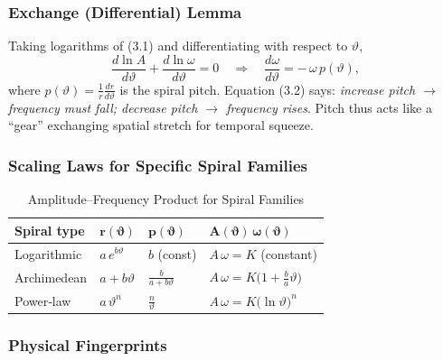 \medskip
\subsubsection{Exchange (Differential) Lemma}

Taking logarithms of (3.1) and differentiating with respect to \(\vartheta\),
\begin{equation}
  \frac{d\ln A}{d\vartheta} + \frac{d\ln\omega}{d\vartheta} = 0
  \quad\Longrightarrow\quad
  \frac{d\omega}{d\vartheta} = -\,\omega\,p(\vartheta),
  \tag{3.2}
\end{equation}
where \(p(\vartheta)=\frac{1}{r}\frac{dr}{d\vartheta}\) is the spiral pitch.  Equation (3.2) says: \emph{increase pitch \(\to\) frequency must fall; decrease pitch \(\to\) frequency rises}. Pitch thus acts like a “gear” exchanging spatial stretch for temporal squeeze.

\medskip
\subsubsection{Scaling Laws for Specific Spiral Families}

\begin{table}[H]
  \small
  \centering
  \caption{Amplitude–Frequency Product for Spiral Families}
  \label{tab:amp-freq-families}
  \begin{tabular}{@{}p{} p{} p{} p{}@{}}
    \toprule
    \textbf{Spiral type}
      & \(\mathbf{r(\vartheta)}\)
      & \(\mathbf{p(\vartheta)}\)
      & \(\mathbf{A(\vartheta)\,\omega(\vartheta)}\) \\
    \midrule
    Logarithmic
      & \(a\,e^{b\vartheta}\)
      & \(b\) (const)
      & \(A\,\omega = K\) (constant) \\
    Archimedean
      & \(a + b\vartheta\)
      & \(\tfrac{b}{a + b\vartheta}\)
      & \(A\,\omega = K\bigl(1 + \tfrac{b}{a}\vartheta\bigr)\) \\
    Power‐law
      & \(a\,\vartheta^{n}\)
      & \(\tfrac{n}{\vartheta}\)
      & \(A\,\omega = K\bigl(\ln\vartheta\bigr)^{n}\) \\
    \bottomrule
  \end{tabular}
\end{table}

\medskip
\subsubsection{Physical Fingerprints}

